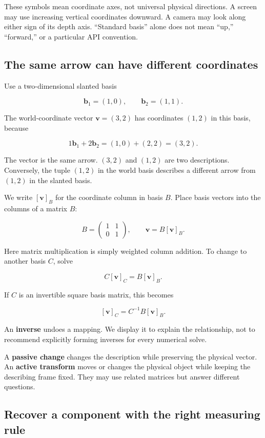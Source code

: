 These symbols mean coordinate axes, not universal physical directions. A screen may use increasing vertical coordinates downward. A camera may look along either sign of its depth axis. ``Standard basis'' alone does not mean ``up,'' ``forward,'' or a particular API convention.

\subsection{The same arrow can have different coordinates}\label{01-foundations-i-ch017-the-same-arrow-can-have-different-coordinates}

Use a two-dimensional slanted basis

\[
\mathbf b_1=(1,0),\qquad \mathbf b_2=(1,1).
\]

The world-coordinate vector \(\mathbf v=(3,2)\) has coordinates \((1,2)\) in this basis, because

\[
1\mathbf b_1+2\mathbf b_2=(1,0)+(2,2)=(3,2).
\]

The vector is the same arrow. \((3,2)\) and \((1,2)\) are two descriptions. Conversely, the tuple \((1,2)\) in the world basis describes a different arrow from \((1,2)\) in the slanted basis.

We write \([\mathbf v]_B\) for the coordinate column in basis \(B\). Place basis vectors into the columns of a matrix \(B\):

\[
B=\begin{pmatrix}1&1\\0&1\end{pmatrix},\qquad
\mathbf v=B[\mathbf v]_B.
\]

Here matrix multiplication is simply weighted column addition. To change to another basis \(C\), solve

\[
C[\mathbf v]_C=B[\mathbf v]_B.
\]

If \(C\) is an invertible square basis matrix, this becomes

\[
[\mathbf v]_C=C^{-1}B[\mathbf v]_B.
\]

An \textbf{inverse} undoes a mapping. We display it to explain the relationship, not to recommend explicitly forming inverses for every numerical solve.

A \textbf{passive change} changes the description while preserving the physical vector. An \textbf{active transform} moves or changes the physical object while keeping the describing frame fixed. They may use related matrices but answer different questions.

\subsection{Recover a component with the right measuring rule}\label{01-foundations-i-ch017-recover-a-component-with-the-right-measuring-rule}

